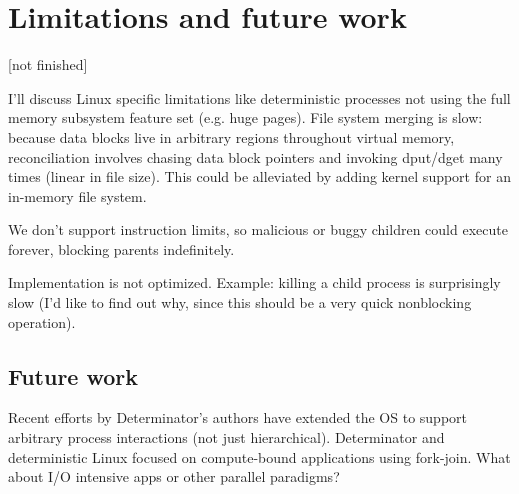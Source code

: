 
\section{Limitations and future work}

[not finished]

I'll discuss Linux specific limitations like deterministic processes not using
the full memory subsystem feature set (e.g. huge pages). File system merging
is slow: because data blocks live in arbitrary regions throughout virtual
memory, reconciliation involves chasing data block pointers and invoking
dput/dget many times (linear in file size). This could be alleviated by
adding kernel support for an in-memory file system.

We don't support instruction limits, so malicious or buggy children could
execute forever, blocking parents indefinitely.

Implementation is not optimized. Example: killing a child process is
surprisingly slow (I'd like to find out why, since this should be a very quick
nonblocking operation).

\subsection{Future work}

Recent efforts by Determinator's authors have extended the OS to support
arbitrary process interactions (not just hierarchical). Determinator and
deterministic Linux focused on compute-bound applications using fork-join.
What about I/O intensive apps or other parallel paradigms?

\endinput

